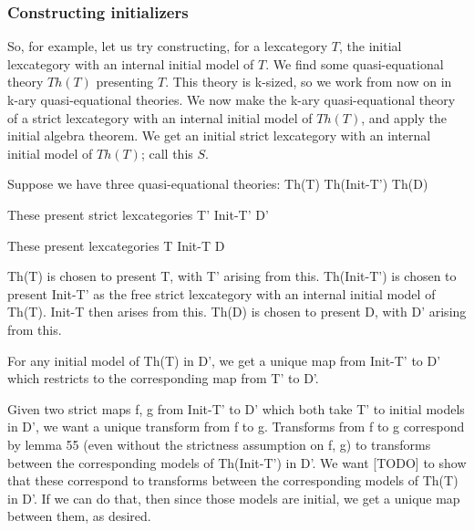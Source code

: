 \subsubsection{Constructing initializers}
So, for example, let us try constructing, for a lexcategory $T$, the initial lexcategory with an internal initial model of $T$. We find some quasi-equational theory $Th(T)$ presenting $T$. This theory is k-sized, so we work from now on in k-ary quasi-equational theories. We now make the k-ary quasi-equational theory of a strict lexcategory with an internal initial model of $Th(T)$, and apply the initial algebra theorem. We get an initial strict lexcategory with an internal initial model of $Th(T)$; call this $S$.

Suppose we have three quasi-equational theories:
Th(T)
Th(Init-T')
Th(D)

These present strict lexcategories
T'
Init-T'
D'

These present lexcategories
T
Init-T
D

Th(T) is chosen to present T, with T' arising from this.
Th(Init-T') is chosen to present Init-T' as the free strict lexcategory with an internal initial model of Th(T). Init-T then arises from this.
Th(D) is chosen to present D, with D' arising from this.

For any initial model of Th(T) in D', we get a unique map from Init-T' to D' which restricts to the corresponding map from T' to D'.

Given two strict maps f, g from Init-T' to D' which both take T' to initial models in D', we want a unique transform from f to g. Transforms from f to g correspond by lemma 55 (even without the strictness assumption on f, g) to transforms between the corresponding models of Th(Init-T') in D'. We want [TODO] to show that these correspond to transforms between the corresponding models of Th(T) in D'. If we can do that, then since those models are initial, we get a unique map between them, as desired.


